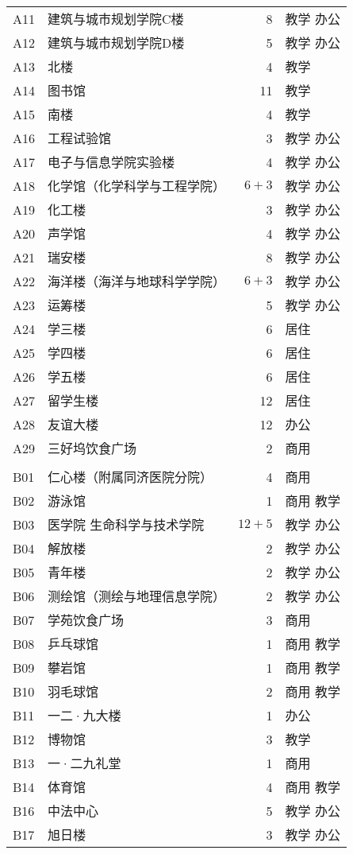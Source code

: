 \begin{center}
\begin{longtable}{|l|l|r|l|}
A11 & 建筑与城市规划学院C楼 & 8  & 教学 办公 \\
A12 & 建筑与城市规划学院D楼 & 5  & 教学 办公 \\
A13 & 北楼 & 4  & 教学 \\
A14 & 图书馆 & 11 & 教学 \\
A15 & 南楼 & 4  & 教学 \\
A16 & 工程试验馆 & 3  & 教学 办公 \\
A17 & 电子与信息学院实验楼 & 4  & 教学 办公 \\
A18 & 化学馆（化学科学与工程学院） & $6+3$ & 教学 办公 \\
A19 & 化工楼 & 3  & 教学 办公 \\
A20 & 声学馆 & 4  & 教学 办公 \\
A21 & 瑞安楼 & 8  & 教学 办公 \\
A22 & 海洋楼（海洋与地球科学学院） & $6+3$ & 教学 办公 \\
A23 & 运筹楼 & 5  & 教学 办公 \\
A24 & 学三楼 & 6  & 居住 \\
A25 & 学四楼 & 6  & 居住 \\
A26 & 学五楼 & 6  & 居住 \\
A27 & 留学生楼 & 12 & 居住 \\
A28 & 友谊大楼 & 12 & 办公 \\
A29 & 三好坞饮食广场 & 2  & 商用  \\
    &    &    &  \\
B01 & 仁心楼（附属同济医院分院） & 4  & 商用  \\
B02 & 游泳馆 & 1  & 商用 教学 \\
B03 & 医学院 生命科学与技术学院 & $12+5$ & 教学 办公 \\
B04 & 解放楼 & 2  & 教学 办公 \\
B05 & 青年楼 & 2  & 教学 办公 \\
B06 & 测绘馆（测绘与地理信息学院） & 2  & 教学 办公 \\
B07 & 学苑饮食广场 & 3  & 商用  \\
B08 & 乒乓球馆 & 1  & 商用 教学 \\
B09 & 攀岩馆 & 1  & 商用 教学 \\
B10 & 羽毛球馆 & 2  & 商用 教学 \\
B11 & 一二·九大楼 & 1  & 办公 \\
B12 & 博物馆 & 3  & 教学 \\
B13 & 一·二九礼堂 & 1  & 商用  \\
B14 & 体育馆 & 4  & 商用 教学 \\
B16 & 中法中心 & 5  & 教学 办公 \\
B17 & 旭日楼 & 3  & 教学 办公 \\
\end{longtable}%
\end{center}%



